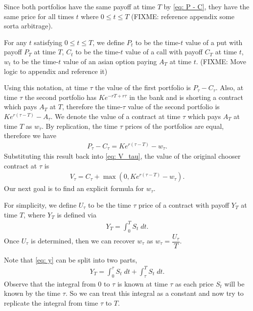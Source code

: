 \documentclass[reqno]{amsart}
\begin{document}
Since both portfolios have the same payoff at time $T$ by \eqref{eq: P - C}, they have the same price for all times $t$ where $0 \leq t \leq T$ (FIXME: reference appendix some sorta arbitrage). 

For any $t$ satisfying $0 \le t \le T$, we define $P_t$ to be the time-$t$ value of a put with payoff $P_T$ at time $T$, $C_t$ to be the time-$t$ value of a call with payoff $C_T$ at time $t$, $w_t$ to be the time-$t$ value of an asian option paying $A_T$ at time $t$. (FIXME: Move logic to appendix and reference it)

Using this notation, at time $\tau$ the value of the first portfolio is $P_\tau - C_\tau$. Also, at time $\tau$ the second portfolio has $Ke^{-rT + r\tau}$ in the bank and is shorting a contract which pays $A_T$ at $T$, therefore the time-$\tau$ value of the second portfolio is $Ke^{r(\tau - T)} - A_\tau$. We denote the value of a contract at time $\tau$ which pays $A_T$ at time $T$ as $w_\tau$.
By replication, the time $\tau$ prices of the portfolios are equal, therefore we have 
\begin{align}\label{eq: P-C Parity}
     P_\tau - C_\tau = Ke^{r(\tau - T)} - w_\tau.
\end{align}
Substituting this result back into \eqref{eq: V_tau}, the value of the original chooser contract at $\tau$ is
\begin{align}
     V_\tau = C_\tau + \max(0, Ke^{r(\tau - T)} - w_\tau).
\end{align}
Our next goal is to find an explicit formula for $w_\tau$. 

For simplicity, we define $U_\tau$ to be the time $\tau$ price of a contract with payoff $Y_T$ at time $T$, where $Y_T$ is defined via
\begin{align}\label{eq: y}
     Y_T = \int_0^T S_t \; dt.
\end{align}
Once $U_\tau$ is determined, then we can recover $w_\tau$ as $w_\tau = \dfrac{U_\tau}{T}$. 

Note that \eqref{eq: y} can be split into
two parts, 
\begin{align}
     Y_T = \int_0^\tau S_t \; dt + \int_\tau^T S_t \; dt.
\end{align}
Observe that the integral from $0$ to $\tau$ is known at time $\tau$ as each price $S_t$ will be known by the time $\tau$. So we can treat this integral as a constant and now try to replicate the integral from time $\tau$ to $T$.
\end{document}
